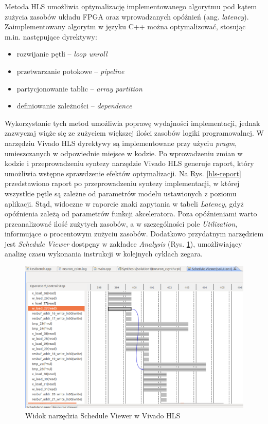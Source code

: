 Metoda HLS umożliwia optymalizację implementowanego algorytmu pod kątem zużycia zasobów układu FPGA oraz wprowadzanych opóźnień (ang. \emph{latency}). Zaimplementowany algorytm w języku C++ można optymalizować, stosując m.in. następujące dyrektywy:
\begin{itemize}
  \item rozwijanie pętli -- \emph{loop unroll}
  \item przetwarzanie potokowe -- \emph{pipeline}
  \item partycjonowanie tablic -- \emph{array partition}
  \item definiowanie zależności -- \emph{dependence}
\end{itemize} 
Wykorzystanie tych metod umożliwia poprawę wydajności implementacji, jednak zazwyczaj wiąże się ze zużyciem większej ilości zasobów logiki programowalnej. W narzędziu Vivado HLS dyrektywy są implementowane przy użyciu \emph{pragm}, umieszczanych w odpowiednie miejsce w kodzie. Po wprowadzeniu zmian w kodzie i przeprowadzeniu syntezy narzędzie Vivado HLS generuje raport, który umożliwia wstępne sprawdzenie efektów optymalizacji. Na Rys. \ref{hls-report} przedstawiono raport po przeprowadzeniu syntezy implementacji, w której wszystkie pętle są zależne od parametrów modelu ustawionych z poziomu aplikacji. Stąd, widoczne w raporcie znaki zapytania w tabeli \emph{Latency}, gdyż opóźnienia zależą od parametrów funkcji akceleratora. Poza opóźnieniami warto przeanalizować ilość zużytych zasobów, a w szczególności pole \emph{Utilization}, informujące o procentowym zużyciu zasobów. Dodatkowo przydatnym narzędziem jest \emph{Schedule Viewer} dostpęny w zakładce \emph{Analysis} (Rys. \ref{scheduler}), umożliwiający analizę czasu wykonania instrukcji w kolejnych cyklach zegara.

\begin{figure}[!h]
  \centering
  \includegraphics[width=\textwidth]{img/scheduler.png}
  \caption{Widok narzędzia Schedule Viewer w Vivado HLS}
  \label{scheduler}
\end{figure}


